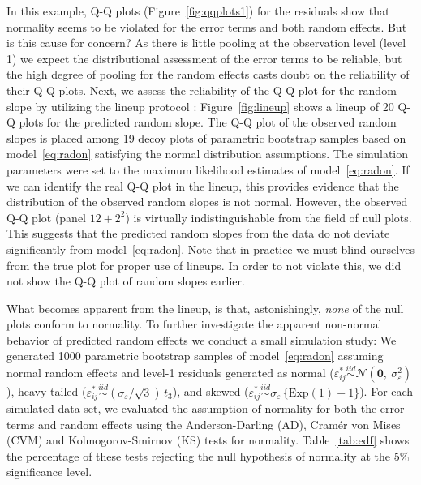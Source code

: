 \documentclass[12pt]{article} %
\begin{document}
In this example, Q-Q plots (Figure~\ref{fig:qqplots1}) for the residuals show that normality 
seems to be violated for the error terms and both random effects. But is this cause for concern?
As there is little pooling at the observation level (level 1) we expect the distributional assessment of the error terms to be reliable, but  the high degree of pooling  for the random effects  casts doubt on the reliability of their Q-Q plots. Next, we assess the reliability of the Q-Q plot for the random slope by utilizing the lineup protocol \citep{buja:2009}:
Figure~\ref{fig:lineup} shows a lineup of 20 Q-Q plots for the predicted random slope. The Q-Q plot of the observed random slopes is placed among 19 decoy plots of parametric bootstrap samples based on model~\eqref{eq:radon} satisfying the normal distribution assumptions. The simulation parameters were set to the maximum likelihood estimates of model~\eqref{eq:radon}. 
If we can identify the real Q-Q plot in the lineup, this provides evidence that the distribution of the observed random slopes is not normal. However, 
the observed Q-Q plot (panel $12+2^2$) is virtually indistinguishable from the field of null plots. This suggests that the predicted random slopes  from the data do not deviate significantly from model~\eqref{eq:radon}.  
Note that in practice we must blind ourselves from the true plot for proper use of lineups. In order to not violate this, we did not show the Q-Q plot of random slopes earlier.

What becomes apparent from the lineup, is that, astonishingly, {\it none} of the null plots conform to normality. To further investigate the apparent non-normal behavior of predicted random effects we conduct a small simulation study: 
%
We generated 1000 parametric bootstrap samples of model~\eqref{eq:radon} assuming normal random effects and level-1 residuals generated as normal ($\varepsilon_{ij}^* \overset{iid}{\sim}  \mathcal{N}(\bm{0},\ \sigma^2_\varepsilon)$), heavy tailed ($\varepsilon_{ij}^* \overset{iid}{\sim} (\sigma_{\varepsilon} / \sqrt{3})\, t_3$), and skewed ($\varepsilon_{ij}^* \overset{iid}{\sim} \sigma_{\varepsilon} \, \{ \text{Exp}(1) - 1 \}$).
For each simulated data set, we evaluated the assumption of normality for both the error terms and random effects using the Anderson-Darling (AD), Cram{\'e}r von Mises (CVM) and  Kolmogorov-Smirnov (KS) tests for normality.  
Table~\ref{tab:edf} shows the percentage of these tests rejecting the null hypothesis of normality at the 5\% significance level. 
\end{document}
